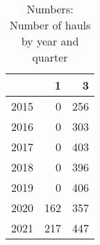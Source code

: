 \begin{table}[ht]
\centering
\begin{tabular}{rrr}
  \hline
 & 1 & 3 \\ 
  \hline
2015 & 0 & 256 \\ 
  2016 & 0 & 303 \\ 
  2017 & 0 & 403 \\ 
  2018 & 0 & 396 \\ 
  2019 & 0 & 406 \\ 
  2020 & 162 & 357 \\ 
  2021 & 217 & 447 \\ 
   \hline
\end{tabular}
\caption{Numbers: Number of hauls by year and quarter} 
\end{table}
